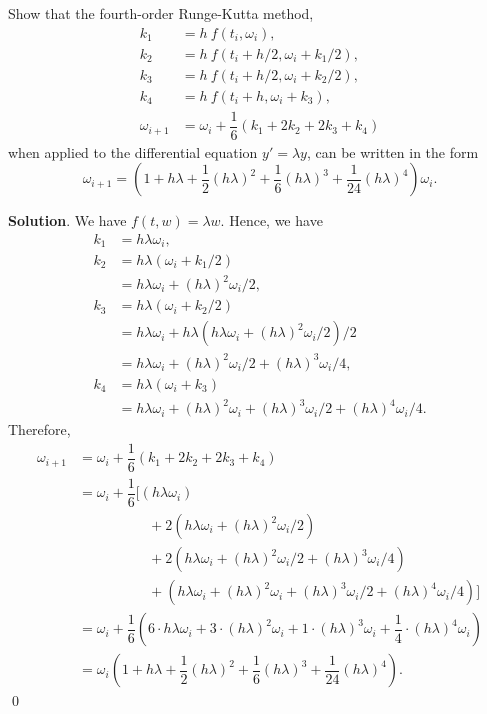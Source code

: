 \documentclass[11pt]{article}
\theoremstyle{break}
\numberwithin{equation}{theorem}
\begin{document}
\newpage
\begin{problem}\label{problem 19} %
    Show that the fourth-order Runge-Kutta method, 
    \begin{align*}
        k_1&=h\:f(t_i, \omega_i),\\
        k_2&=h\:f(t_i+h/2, \omega_i+k_1/2),\\
        k_3&=h\:f(t_i+h/2, \omega_i+k_2/2),\\
        k_4&=h\:f(t_i+h, \omega_i+k_3),\\
        \omega_{i+1}&=\omega_{i}+\dfrac{1}{6}\left(k_1+2k_2+2k_3+k_4\right)
    \end{align*}
    when applied to the differential equation $y'=\lambda y$, can be written in the form $$\omega_{i+1}=\left(1+h\lambda+\dfrac{1}{2}(h\lambda)^2+\dfrac{1}{6}(h\lambda)^3+\dfrac{1}{24}(h\lambda)^4\right)\omega_{i}.$$
\end{problem}
\textbf{Solution}. We have $f(t, w)=\lambda w$. Hence, we have
\begin{align*}
    k_1&=h\lambda\omega_i,\\
    k_2&=h\lambda(\omega_i+k_1/2)\\
    &=h\lambda\omega_i+(h\lambda)^2\omega_i/2,\\
    k_3&=h\lambda(\omega_i+k_2/2)\\
    &=h\lambda\omega_i+h\lambda(h\lambda\omega_i+(h\lambda)^2\omega_i/2)/2\\
    &=h\lambda\omega_i+(h\lambda)^2\omega_i/2+(h\lambda)^3\omega_i/4,\\
    k_4&=h\lambda(\omega_i+k_3)\\
    &=h\lambda\omega_i+(h\lambda)^2\omega_i+(h\lambda)^3\omega_i/2+(h\lambda)^4\omega_i/4.
\end{align*}
Therefore,
\begin{align*}
    \omega_{i+1}&=\omega_{i}+\dfrac{1}{6}\left(k_1+2k_2+2k_3+k_4\right)\\
    &=\omega_i+\dfrac{1}{6}[\left(h\lambda\omega_i\right)\\&\qquad\quad\qquad+2\left(h\lambda\omega_i+(h\lambda)^2\omega_i/2\right)\\&\qquad\quad\qquad+2\left(h\lambda\omega_i+(h\lambda)^2\omega_i/2+(h\lambda)^3\omega_i/4\right)\\&\qquad\quad\qquad+\left(h\lambda\omega_i+(h\lambda)^2\omega_i+(h\lambda)^3\omega_i/2+(h\lambda)^4\omega_i/4\right)]\\
    &=\omega_i+\dfrac{1}{6}\left(6\cdot h\lambda\omega_i+3\cdot(h\lambda)^2\omega_i+1\cdot(h\lambda)^3\omega_i+\dfrac{1}{4}\cdot(h\lambda)^4\omega_i\right)\\
    &=\omega_i\left(1+h\lambda+\dfrac{1}{2}(h\lambda)^2+\dfrac{1}{6}(h\lambda)^3+\dfrac{1}{24}(h\lambda)^4\right).
\end{align*} \qed
\end{document}
